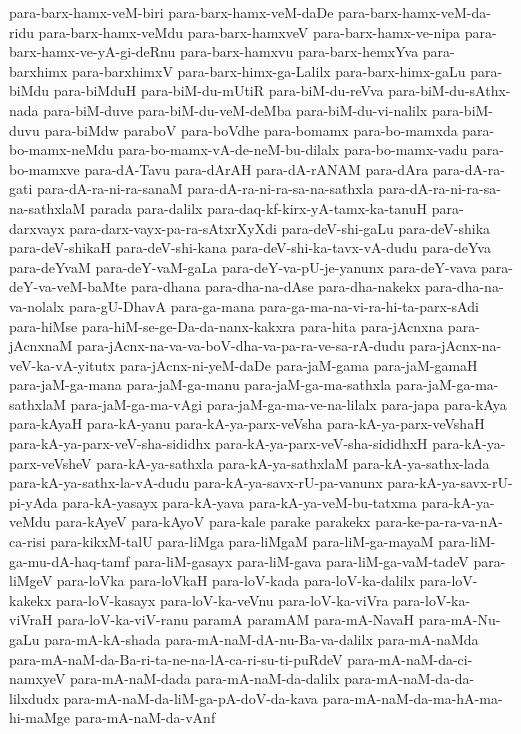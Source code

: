 {para-barx-hamx-veM-biri
para-barx-hamx-veM-daDe
para-barx-hamx-veM-da-ridu
para-barx-hamx-veMdu
para-barx-hamxveV
para-barx-hamx-ve-nipa
para-barx-hamx-ve-yA-gi-deRnu
para-barx-hamxvu
para-barx-hemxYva
para-barxhimx
para-barxhimxV
para-barx-himx-ga-Lalilx
para-barx-himx-gaLu
para-biMdu
para-biMduH
para-biM-du-mUtiR
para-biM-du-reVva
para-biM-du-sAthx-nada
para-biM-duve
para-biM-du-veM-deMba
para-biM-du-vi-nalilx
para-biM-duvu
para-biMdw
paraboV
para-boVdhe
para-bomamx
para-bo-mamxda
para-bo-mamx-neMdu
para-bo-mamx-vA-de-neM-bu-dilalx
para-bo-mamx-vadu
para-bo-mamxve
para-dA-Tavu
para-dArAH
para-dA-rANAM
para-dAra
para-dA-ra-gati
para-dA-ra-ni-ra-sanaM
para-dA-ra-ni-ra-sa-na-sathxla
para-dA-ra-ni-ra-sa-na-sathxlaM
parada
para-dalilx
para-daq-kf-kirx-yA-tamx-ka-tanuH
para-darxvayx
para-darx-vayx-pa-ra-sAtxrXyXdi
para-deV-shi-gaLu
para-deV-shika
para-deV-shikaH
para-deV-shi-kana
para-deV-shi-ka-tavx-vA-dudu
para-deYva
para-deYvaM
para-deY-vaM-gaLa
para-deY-va-pU-je-yanunx
para-deY-vava
para-deY-va-veM-baMte
para-dhana
para-dha-na-dAse
para-dha-nakekx
para-dha-na-va-nolalx
para-gU-DhavA
para-ga-mana
para-ga-ma-na-vi-ra-hi-ta-parx-sAdi
para-hiMse
para-hiM-se-ge-Da-da-nanx-kakxra
para-hita
para-jAcnxna
para-jAcnxnaM
para-jAcnx-na-va-va-boV-dha-va-pa-ra-ve-sa-rA-dudu
para-jAcnx-na-veV-ka-vA-yitutx
para-jAcnx-ni-yeM-daDe
para-jaM-gama
para-jaM-gamaH
para-jaM-ga-mana
para-jaM-ga-manu
para-jaM-ga-ma-sathxla
para-jaM-ga-ma-sathxlaM
para-jaM-ga-ma-vAgi
para-jaM-ga-ma-ve-na-lilalx
para-japa
para-kAya
para-kAyaH
para-kA-yanu
para-kA-ya-parx-veVsha
para-kA-ya-parx-veVshaH
para-kA-ya-parx-veV-sha-sididhx
para-kA-ya-parx-veV-sha-sididhxH
para-kA-ya-parx-veVsheV
para-kA-ya-sathxla
para-kA-ya-sathxlaM
para-kA-ya-sathx-lada
para-kA-ya-sathx-la-vA-dudu
para-kA-ya-savx-rU-pa-vanunx
para-kA-ya-savx-rU-pi-yAda
para-kA-yasayx
para-kA-yava
para-kA-ya-veM-bu-tatxma
para-kA-ya-veMdu
para-kAyeV
para-kAyoV
para-kale
parake
parakekx
para-ke-pa-ra-va-nA-ca-risi
para-kikxM-talU
para-liMga
para-liMgaM
para-liM-ga-mayaM
para-liM-ga-mu-dA-haq-tamf
para-liM-gasayx
para-liM-gava
para-liM-ga-vaM-tadeV
para-liMgeV
para-loVka
para-loVkaH
para-loV-kada
para-loV-ka-dalilx
para-loV-kakekx
para-loV-kasayx
para-loV-ka-veVnu
para-loV-ka-viVra
para-loV-ka-viVraH
para-loV-ka-viV-ranu
paramA
paramAM
para-mA-NavaH
para-mA-Nu-gaLu
para-mA-kA-shada
para-mA-naM-dA-nu-Ba-va-dalilx
para-mA-naMda
para-mA-naM-da-Ba-ri-ta-ne-na-lA-ca-ri-su-ti-puRdeV
para-mA-naM-da-ci-namxyeV
para-mA-naM-dada
para-mA-naM-da-dalilx
para-mA-naM-da-da-lilxdudx
para-mA-naM-da-liM-ga-pA-doV-da-kava
para-mA-naM-da-ma-hA-ma-hi-maMge
para-mA-naM-da-vAnf
}
